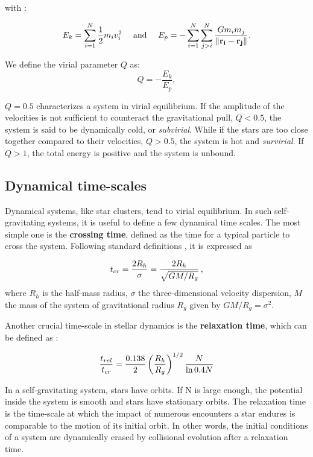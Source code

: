 with :

\begin{equation}
 E_k = \sum_{i=1}^N  \frac{1}{2}m_i v_i^2 ~~~~\textrm{and}~~~~ E_p = - \sum_{i=1}^N \sum_{j>i}^N \frac{G m_i m_j}{\| \bold{r_i} - \bold{r_j}\| } .
\end{equation}

We define the virial parameter $Q$ as:
\begin{equation}
Q = - \frac{E_k}{E_p},
\end{equation}

$Q=0.5$ characterizes a system in virial equilibrium. If the amplitude of the velocities is not sufficient to counteract the gravitational pull, $Q<0.5$, the system is said to be dynamically cold, or \textit{subvirial}. While if the stars are too close together compared to their velocities, $Q>0.5$, the system is hot and \textit{survirial}. If $Q>1$, the total energy is positive and the system is unbound. 


\subsection{Dynamical time-scales}
\label{Sub:0_time-scales}

Dynamical systems, like star clusters, tend to virial equilibrium. In such self-gravitating systems, it is useful to define a few dynamical time scales. The most simple one is the \textbf{crossing time}, defined as the time for a typical particle to cross the system. Following standard definitions \citep{Meylan1997,Fleck2006}, it is expressed as 

\begin{equation}
\label{Eq:0_tcr}
     t_{cr} = \frac{2R_h}{\sigma} = \frac{2 R_h}{\sqrt{GM/R_g} } \, ,
\end{equation}
where $R_h$ is the half-mass radius, $\sigma$ the three-dimensional velocity dispersion, $M$ the mass of the system of gravitational radius $R_g$ given by $GM / R_g = \sigma^2$. 

Another crucial time-scale in stellar dynamics is the \textbf{relaxation time}, which can be defined as \citep{Heggie2003}:

\begin{equation} 
\label{Eq:0_trel}
\frac{t_{rel}}{t_{cr}} = \frac{0.138}{2} \left(\frac{R_h}{R_g}\right)^{1/2} \frac{N}{\ln 0.4 N}  
\end{equation}

In a self-gravitating system, stars have orbits. If N is large enough, the potential inside the system is smooth and stars have stationary orbits. The relaxation time is the time-scale at which the impact of numerous encounters a star endures is comparable to the motion of its initial orbit. In other words, the initial conditions of a system are dynamically erased by collisional evolution after a relaxation time.


